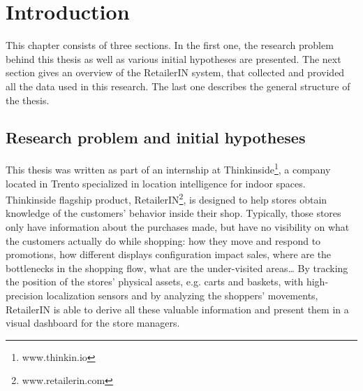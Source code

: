 \chapter{Introduction}
\label{cha:introduction}

This chapter consists of three sections. In the first one, the research problem behind this thesis as well as various initial hypotheses are presented. The next section gives an overview of the RetailerIN system, that collected and provided all the data used in this research. The last one describes the general structure of the thesis.

\section{Research problem and initial hypotheses}
\label{sec:research_problem_and_initial_hypoteses}

This thesis was written as part of an internship at Thinkinside\footnote{www.thinkin.io}, a company located in Trento specialized in location intelligence for indoor spaces. Thinkinside flagship product, RetailerIN\footnote{www.retailerin.com}, is designed to help stores obtain knowledge of the customers’ behavior inside their shop. Typically, those stores only have information about the purchases made, but have no visibility on what the customers actually do while shopping: how they move and respond to promotions, how different displays configuration impact sales, where are the bottlenecks in the shopping flow, what are the under-visited areas… By tracking the position of the stores’ physical assets, e.g. carts and baskets, with high-precision localization sensors and by analyzing the shoppers’ movements, RetailerIN is able to derive all these valuable information and present them in a visual dashboard for the store managers.

